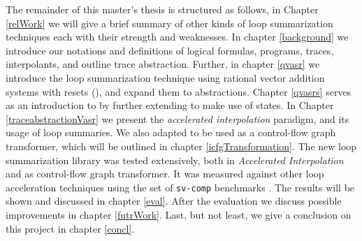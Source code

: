 The remainder of this master's thesis is structured as follows, in Chapter \ref{relWork} we will give a brief summary of other kinds of loop summarization techniques each with their strength and weaknesses. In chapter \ref{background} we introduce our notations and definitions of logical formulas, programs, traces, interpolants, and outline trace abstraction. Further, in chapter \ref{qvasr} we introduce the loop summarization technique using rational vector addition systems with resets (\qvasr), and expand them to \qvasr abstractions. Chapter \ref{qvasrs} serves as an introduction to \qvasrs by further extending \qvasr to make use of states. In Chapter \ref{traceabstractionVasr} we present the \textsl{accelerated interpolation} paradigm, and its usage of \qvasr loop summaries. We also adapted \qvasr to be used as a control-flow graph transformer, which will be outlined in chapter \ref{icfgTransformation}. The new loop summarization library was tested extensively, both in \textsl{Accelerated Interpolation} and as control-flow graph transformer. It was measured against other loop acceleration techniques using the set of \texttt{sv-comp} benchmarks \cite{svcomp}. The results will be shown and discussed in chapter \ref{eval}. After the evaluation we discuss possible improvements in chapter \ref{futrWork}. Last, but not least, we give a conclusion on this project in chapter \ref{concl}.

